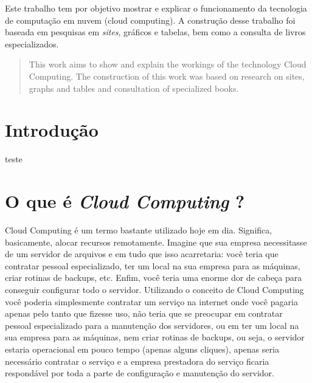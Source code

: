\documentclass{abnt}
\begin{document}
	\capa
	
	\folhaderosto
	
	\begin{resumo}
		Este trabalho tem por objetivo mostrar e explicar o funcionamento da tecnologia de computação em nuvem (cloud computing). 
		A construção desse trabalho foi baseada em pesquisas em \textit{sites}, gráficos e tabelas, bem como a consulta de livros especializados.
	\end{resumo}

	\begin{abstract}
		This work aims to show and explain the workings of the technology Cloud Computing. The construction of this work was based on research on sites, graphs and tables and consultation of specialized books.
	\end{abstract}
	
	\sumario
	
	\listadetabelas
	
	\listadefiguras
	
	\newpage
	
	\chapter{Introdução}
		teste
	\chapter{O que é \textit{Cloud Computing} ?}
Cloud Computing é um termo bastante utilizado hoje em dia. Significa, basicamente, alocar recursos remotamente. Imagine que sua empresa necessitasse de um servidor de arquivos e em tudo que isso acarretaria: você teria que contratar pessoal especializado, ter um local na sua empresa para as máquinas, criar rotinas de backups, etc. Enfim, você teria uma enorme dor de cabeça para conseguir configurar todo o servidor. Utilizando o conceito de Cloud Computing você poderia simplesmente contratar um serviço na internet onde você pagaria apenas pelo tanto que fizesse uso, não teria que se preocupar em contratar pessoal especializado para a manutenção dos servidores, ou em ter um local na sua empresa para as máquinas, nem criar rotinas de backups, ou seja, o servidor estaria operacional em pouco tempo (apenas alguns cliques), apenas seria necessário contratar o serviço e a empresa prestadora do serviço ficaria respondável por toda a parte de configuração e manutenção do servidor.
\end{document}
